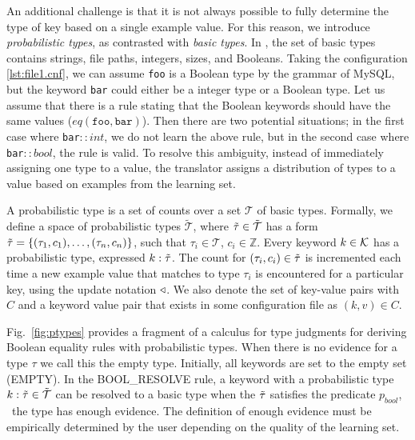 An additional challenge is that it is not always possible to fully determine the type of key based on a single example value. 
For this reason, we introduce \textit{probabilistic types}, as contrasted with \textit{basic types}.
In \app, the set of basic types contains strings, file paths, integers, sizes, and Booleans. 
Taking the configuration \ref{lst:file1.cnf}, we can assume {\tt foo} is a Boolean type by the grammar of MySQL,
  but the keyword {\tt bar} could either be a integer type or a Boolean type.
Let us assume that there is a rule stating that the Boolean keywords should have the same values ($eq(\texttt{foo},\texttt{bar})$).
Then there are two potential situations; in the first case where {\tt bar}$::int$, we do not learn the above rule, but in the second case where {\tt bar}$::bool$, the rule is valid.
To resolve this ambiguity, instead of immediately assigning one type to a value, the translator assigns a distribution of types to a value based on examples from the learning set.


A probabilistic type is a set of counts over a set $\mathcal{T}$ of basic types.
Formally, we define a space of probabilistic types $\tilde{\mathcal{T}}$, where $\tilde{\tau} \in \tilde{\mathcal{T}}$ has a form $\tilde{\tau}=\{(\tau_1, c_1),\ldots,(\tau_n, c_n)\}$, such that $\tau_i \in \mathcal{T}$, $c_i \in \mathbb{Z}$. 
Every keyword $k\in\mathcal{K}$ has a probabilistic type, expressed $k:\tilde{\tau}$.
The count for $(\tau_i,c_i) \in \tilde{\tau}$ is incremented each time a new example value that matches to type $\tau_i$ is encountered for a particular key, using the update notation $\triangleleft$.
We also denote the set of key-value pairs with $C$ and a keyword value pair that exists in some configuration file as $(k,v) \in C$.

Fig.~\ref{fig:ptypes} provides a fragment of a calculus for type judgments for deriving Boolean equality rules with probabilistic types.
When there is no evidence for a type $\tau$ we call this the empty type. 
Initially, all keywords are set to the empty set ({\scriptsize EMPTY}).
In the {\scriptsize BOOL\_RESOLVE} rule, a keyword with a probabilistic type $k : \tilde{\tau} \in \tilde{\mathcal{T}}$ can be resolved to a basic type when the $\tilde{\tau}$ satisfies the predicate $p_{bool}$, \ie\ the type has enough evidence.
The definition of enough evidence must be empirically determined by the user depending on the quality of the learning set.

